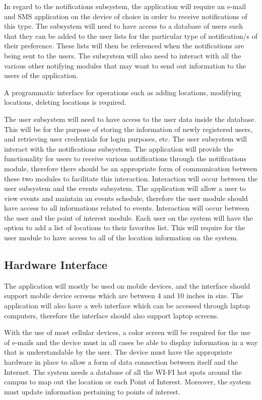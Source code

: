 \documentclass{article}
\begin{document}
In regard to the notifications subsystem, the application will require an e-mail and SMS application on the device of choice in order to receive notifications of this type.
The subsystem will need to have access to a database of users such that they can be added to the user lists for the particular type of notification/s of their preference. These lists will then be referenced when the notifications are being sent to the users. The subsystem will also need to interact with all the various other notifying modules that may want to send out information to the users of the application.

A programmatic interface for operations such as adding locations, modifying locations, deleting locations is required.


The user subsystem will need to have access to the user data inside the database. This will be for the purpose of storing the information of newly registered users, and retrieving user credentials for login purposes, etc. The user subsystem will interact with the notifications subsystem. The application will provide the functionality for users to receive various notifications through the notifications module, therefore there should be an appropriate form of communication between these two modules to facilitate this interaction. Interaction will occur between the user subsystem and the events subsystem. The application will allow a user to view events and maintain an events schedule, therefore the user module should have access to all informations related to events. Interaction will occur between the user and the point of interest module. Each user on the system will have the option to add a list of locations to their favorites list. This will require for the user module to have access to all of the location information on the system.

\subsection{Hardware Interface}

The application will mostly be used on mobile devices, and the interface should support mobile device screens which are between 4 and 10 inches in size. The application will also have a web interface which can be accessed through laptop computers, therefore the interface should also support laptop screens.

\bigskip
With the use of most cellular devices, a color screen will be required for the use of e-mails and the device must in all cases be able to display information in a way that is understandable by the user.
The device must have the appropriate hardware in place to allow a form of data connection between itself and the Internet.
The system needs a database of all the WI-FI hot spots around the campus to map out the location or each Point of Interest. Moreover, the system must update information pertaining to points of interest.
\end{document}
